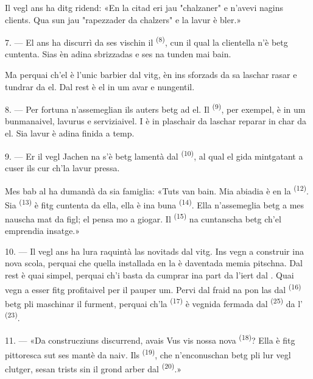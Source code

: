 Il vegl ans ha ditg ridend: «En la citad eri jau "chalzaner" e n'avevi nagins
clients. Qua sun jau "rapezzader da chalzers" e la lavur è bler.»

7. --- El ans ha discurrì da ses vischin il  \textsuperscript{(8)}, cun
il qual la clientella n'è betg cuntenta. Sias  èn adina sbrizzadas e
ses  na tunden mai bain.

Ma perquai ch'el è l'unic barbier dal vitg, èn ins sforzads da sa laschar rasar e
tundrar da el. Dal rest è el in um avar e nungentil.

8. --- Per fortuna n'assemeglian ils auters  betg ad el. Il
 \textsuperscript{(9)}, per exempel, è in um bunmanaivel, lavurus e
serviziaivel. I è in plaschair da laschar reparar in char da el. Sia lavur è adina
finida a temp.

9. --- Er il vegl Jachen na s'è betg lamentà dal 
\textsuperscript{(10)}, al qual el gida mintgatant a cuser ils  cur
ch'la lavur pressa.

Mes bab al ha dumandà da sia famiglia: «Tuts van bain. Mia abiadia è en la
 \textsuperscript{(12)}. Sia  \textsuperscript{(13)} è
fitg cuntenta da ella, ella è ina buna  \textsuperscript{(14)}. Ella
n'assemeglia betg a mes nauscha mat da figl; el pensa mo a giogar. Il
 \textsuperscript{(15)} na cuntanscha betg ch'el emprendia insatge.»

\VUsaut{3.0mm}
\VUsaut{3.0mm}

10. --- Il vegl ans ha lura raquintà las novitads dal vitg. Ins vegn a construir ina
nova scola, perquai che quella installada en la  è daventada
memia pitschna. Dal rest è quai simpel, perquai ch'i basta da cumprar ina part da
l'iert dal . Quai vegn a esser fitg profitaivel per il pauper um.
Pervi dal fraid na pon las  dal  \textsuperscript{(16)}
betg pli maschinar il furment, perquai ch'la  \textsuperscript{(17)} è
vegnida fermada dal  \textsuperscript{(25)} da l'
\textsuperscript{(23)}.

11. --- «Da construcziuns discurrend, avais Vus vis nossa nova 
\textsuperscript{(18)}? Ella è fitg pittoresca sut ses mantè da naiv. Ils
 \textsuperscript{(19)}, che n'enconuschan betg pli lur vegl clutger,
sesan trists sin il grond arber dal  \textsuperscript{(20)}.»

